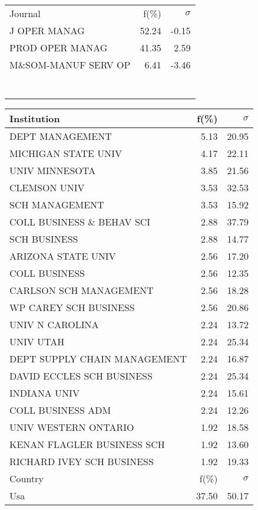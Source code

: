 \documentclass[a4paper,11pt]{report}
\begin{document}
\begin{landscape}
\begin{table}[!ht]
{\begin{tabular}{|l r  r|}
 &  & \\
\hline
\hline
Journal & f(\%) & $\sigma$\\
\hline
J OPER MANAG & 52.24 & -0.15\\
PROD OPER MANAG & 41.35 & 2.59\\
M\&SOM-MANUF SERV OP & 6.41 & -3.46\\
 &  & \\
 &  & \\
 &  & \\
 &  & \\
 &  & \\
 &  & \\
 &  & \\
\hline
\end{tabular}
}
{\scriptsize\begin{tabular}{|l r r|}
\hline
Institution & f(\%) & $\sigma$\\
\hline
DEPT MANAGEMENT & 5.13 & 20.95\\
MICHIGAN STATE UNIV & 4.17 & 22.11\\
UNIV MINNESOTA & 3.85 & 21.56\\
CLEMSON UNIV & 3.53 & 32.53\\
SCH MANAGEMENT & 3.53 & 15.92\\
COLL BUSINESS \& BEHAV SCI & 2.88 & 37.79\\
SCH BUSINESS & 2.88 & 14.77\\
ARIZONA STATE UNIV & 2.56 & 17.20\\
COLL BUSINESS & 2.56 & 12.35\\
CARLSON SCH MANAGEMENT & 2.56 & 18.28\\
WP CAREY SCH BUSINESS & 2.56 & 20.86\\
UNIV N CAROLINA & 2.24 & 13.72\\
UNIV UTAH & 2.24 & 25.34\\
DEPT SUPPLY CHAIN MANAGEMENT & 2.24 & 16.87\\
DAVID ECCLES SCH BUSINESS & 2.24 & 25.34\\
INDIANA UNIV & 2.24 & 15.61\\
COLL BUSINESS ADM & 2.24 & 12.26\\
UNIV WESTERN ONTARIO & 1.92 & 18.58\\
KENAN FLAGLER BUSINESS SCH & 1.92 & 13.60\\
RICHARD IVEY SCH BUSINESS & 1.92 & 19.33\\
\hline
\hline
Country & f(\%) & $\sigma$\\
\hline
Usa & 37.50 & 50.17\\

\end{tabular}}
\end{table}
\end{landscape}
\end{document}
